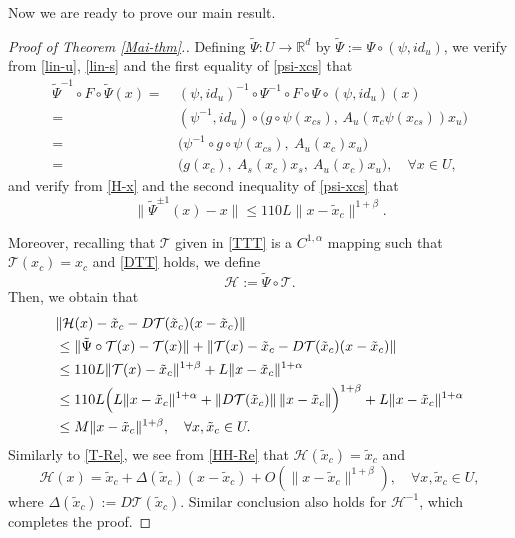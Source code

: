 \documentclass[reqno]{amsart}
\numberwithin{equation}{section}
\begin{document}
Now we are ready to prove our main result.

\begin{proof}[Proof of Theorem {\rm \ref{Mai-thm}.}]
Defining $\tilde \Psi:U\to \mathbb{R}^d$ by
 $\tilde \Psi:=\Psi\circ (\psi,id_u)$, we verify from \eqref{lin-u}, \eqref{lin-s} and the first equality of \eqref{psi-xcs} that
\begin{align*}
 \tilde \Psi^{-1} \circ F \circ \tilde \Psi(x)
 =&~ (\psi,id_u)^{-1} \circ \Psi^{-1} \circ F \circ \Psi \circ (\psi,id_u)(x)
\\
=&~ (\psi^{-1},id_u)\circ \Big(g\circ \psi(x_{cs}), \, A_u(\pi_c \psi(x_{cs}))x_u\Big)
\\
=&~ \Big(\psi^{-1}\circ g \circ \psi(x_{cs}), ~A_u(x_c)x_u\Big)
\\
=&~ \Big(g(x_c), ~A_s(x_c)x_s, ~A_u(x_c)x_u\Big),\quad \forall x\in U,
\end{align*}
and verify from \eqref{H-x} and the second inequality of \eqref{psi-xcs} that
$$
\|\tilde \Psi^{\pm 1}(x)-x\|\le  110L\|x-\tilde x_c\|^{1+\beta}.
$$


Moreover, recalling that ${\mathcal T}$ given in \eqref{TTT} is a $C^{1,\alpha}$ mapping such that ${\mathcal T}(x_c)=x_c$ and \eqref{DTT} holds,
we define
$$
{\mathcal H}:=\tilde \Psi\circ {\mathcal T}.
$$
Then, we obtain that
\begin{align}\label{HH-Re}
&\|{\mathcal H}(x)-\tilde x_c-D{\mathcal T}(\tilde x_c)(x-\tilde x_c)\|
\notag \\
&\le \|\tilde \Psi\circ {\mathcal T}(x)-{\mathcal T}(x)\|+\|{\mathcal T}(x)-\tilde x_c-D{\mathcal T}(\tilde x_c)(x-\tilde x_c)\|
\notag \\
&\le 110L\|{\mathcal T}(x)-\tilde x_c\|^{1+\beta}
+L\|x-\tilde x_c\|^{1+\alpha}
\notag \\
&\le 110L\Big(L\|x-\tilde x_c\|^{1+\alpha}+\|D{\mathcal T}(\tilde x_c)\|\,\|x-\tilde x_c\|\Big)^{1+\beta}+L\|x-\tilde x_c\|^{1+\alpha}
\notag \\
&\le M\|x-\tilde x_c\|^{1+\beta},\quad \forall x,\tilde x_c\in U.
\end{align}
Similarly to \eqref{T-Re}, we see from \eqref{HH-Re} that $\mathcal{H}(\tilde{x}_c)=\tilde{x}_c$ and
$$
\mathcal{H}(x)=\tilde{x}_c+\Delta(\tilde x_c)(x-\tilde x_c)+O(\|x-\tilde{x}_c\|^{1+\beta}), \quad \forall x,\tilde x_c\in U,
$$
where $\Delta(\tilde x_c):=D{\mathcal T}(\tilde x_c)$.
Similar conclusion also holds for ${\mathcal H}^{-1}$, which completes the proof.
\end{proof}
\end{document}
